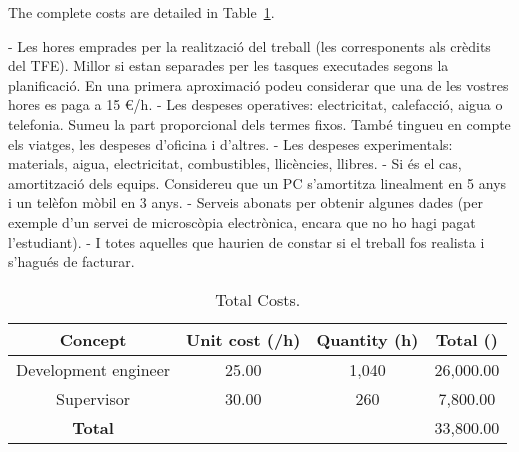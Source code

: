 

The complete costs are detailed in Table~\ref{tab:equip}.

-	Les hores emprades per la realització del treball (les corresponents als crèdits del TFE). Millor 
si estan separades per les tasques executades segons la planificació. En una primera aproximació podeu considerar
 que una de les vostres hores es paga a 15 €/h.
-	Les despeses operatives: electricitat, calefacció, aigua o telefonia. Sumeu la part proporcional dels termes fixos.
 També tingueu en compte els viatges, les despeses d'oficina i d'altres.
-	Les despeses experimentals: materials, aigua, electricitat, combustibles, llicències, llibres.
-	Si és el cas, amortització dels equips. Considereu que un PC s'amortitza linealment en 5 anys i un telèfon mòbil en 3 anys.
-	Serveis abonats per obtenir algunes dades (per exemple d'un servei de microscòpia electrònica, encara que no ho hagi pagat l'estudiant).
-	I totes aquelles que haurien de constar si el treball fos realista i s'hagués de facturar. 


\begin{table}[!htb]\centering
	\caption{Total Costs.}
	\begin{tabular}{ccc|c}
		\hline
		\textbf{Concept} & \textbf{Unit cost (\texteuro/h)} & \textbf{Quantity (h)} & \textbf{Total (\texteuro)} \\
		\hline
		\hline
		Development engineer & 25.00 & 1,040 & 26,000.00 \\ 
		Supervisor & 30.00 & 260 & 7,800.00 \\
		\hline
		\textbf{Total} & & & 33,800.00 \\
		\hline
	\end{tabular}
	\label{tab:equip}
\end{table}


